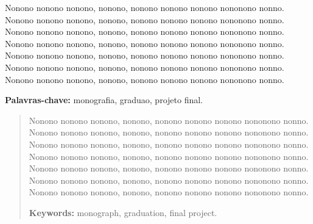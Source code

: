 \documentclass[normaltoc,capchap,capsec,times]{abnt}
\begin{document}



\begin{resumo}
Nonono nonono nonono, nonono, nonono nonono nonono nononono nonno.
Nonono nonono nonono, nonono, nonono nonono nonono nononono nonno.
Nonono nonono nonono, nonono, nonono nonono nonono nononono nonno.
Nonono nonono nonono, nonono, nonono nonono nonono nononono nonno.
Nonono nonono nonono, nonono, nonono nonono nonono nononono nonno.
Nonono nonono nonono, nonono, nonono nonono nonono nononono nonno.
Nonono nonono nonono, nonono, nonono nonono nonono nononono nonno.

\textbf{Palavras-chave:}
monografia,
graduao, 
projeto final.
\end{resumo}

\begin{abstract}
Nonono nonono nonono, nonono, nonono nonono nonono nononono nonno.
Nonono nonono nonono, nonono, nonono nonono nonono nononono nonno.
Nonono nonono nonono, nonono, nonono nonono nonono nononono nonno.
Nonono nonono nonono, nonono, nonono nonono nonono nononono nonno.
Nonono nonono nonono, nonono, nonono nonono nonono nononono nonno.
Nonono nonono nonono, nonono, nonono nonono nonono nononono nonno.
Nonono nonono nonono, nonono, nonono nonono nonono nononono nonno.

\textbf{Keywords:} 
monograph,
graduation,
final project.
\end{abstract}

\listadefiguras
\listadesiglas

\sumario







\end{document}

